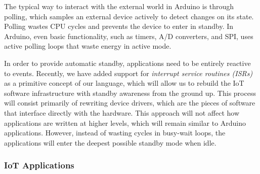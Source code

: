 \documentclass[12pt,english]{amsart}
\begin{document}
The typical way to interact with the external world in Arduino is through
polling, which samples an
external device actively to detect changes on its state. %
Polling wastes CPU cycles and prevents the device to enter in standby.
In Arduino, even basic functionality, such as timers, A/D converters, and
SPI, uses active polling loops that waste energy in active mode.

In order to provide automatic standby, applications need to be entirely
reactive to events.
%
Recently, we have added support for \emph{interrupt service routines (ISRs)} as
a primitive concept of our language, which will allow us to rebuild the IoT
software infrastructure with standby awareness from the ground up.
%
This process will consist primarily of rewriting device drivers, which are the
pieces of software that interface directly with the hardware.
%
%
This approach will not affect how applications are written at higher levels,
which will remain similar to Arduino applications.
However, instead of wasting cycles in busy-wait loops, the applications will
enter the deepest possible standby mode when idle.

\subsubsection{IoT Applications}
\label{sec.method.apps}
\end{document}
